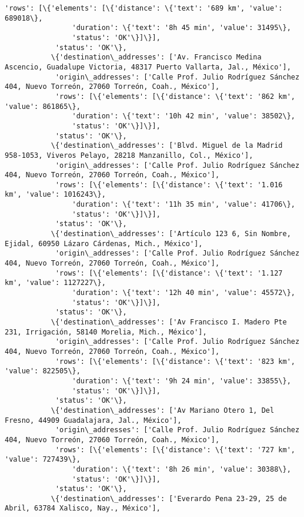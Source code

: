 \documentclass[11pt]{article}
\begin{document}
\begin{Verbatim}[commandchars=\\\{\}]
            'rows': [\{'elements': [\{'distance': \{'text': '689 km', 'value': 689018\},
                'duration': \{'text': '8h 45 min', 'value': 31495\},
                'status': 'OK'\}]\}],
            'status': 'OK'\},
           \{'destination\_addresses': ['Av. Francisco Medina Ascencio, Guadalupe Victoria, 48317 Puerto Vallarta, Jal., México'],
            'origin\_addresses': ['Calle Prof. Julio Rodríguez Sánchez 404, Nuevo Torreón, 27060 Torreón, Coah., México'],
            'rows': [\{'elements': [\{'distance': \{'text': '862 km', 'value': 861865\},
                'duration': \{'text': '10h 42 min', 'value': 38502\},
                'status': 'OK'\}]\}],
            'status': 'OK'\},
           \{'destination\_addresses': ['Blvd. Miguel de la Madrid 958-1053, Viveros Pelayo, 28218 Manzanillo, Col., México'],
            'origin\_addresses': ['Calle Prof. Julio Rodríguez Sánchez 404, Nuevo Torreón, 27060 Torreón, Coah., México'],
            'rows': [\{'elements': [\{'distance': \{'text': '1.016 km', 'value': 1016243\},
                'duration': \{'text': '11h 35 min', 'value': 41706\},
                'status': 'OK'\}]\}],
            'status': 'OK'\},
           \{'destination\_addresses': ['Artículo 123 6, Sin Nombre, Ejidal, 60950 Lázaro Cárdenas, Mich., México'],
            'origin\_addresses': ['Calle Prof. Julio Rodríguez Sánchez 404, Nuevo Torreón, 27060 Torreón, Coah., México'],
            'rows': [\{'elements': [\{'distance': \{'text': '1.127 km', 'value': 1127227\},
                'duration': \{'text': '12h 40 min', 'value': 45572\},
                'status': 'OK'\}]\}],
            'status': 'OK'\},
           \{'destination\_addresses': ['Av Francisco I. Madero Pte 231, Irrigación, 58140 Morelia, Mich., México'],
            'origin\_addresses': ['Calle Prof. Julio Rodríguez Sánchez 404, Nuevo Torreón, 27060 Torreón, Coah., México'],
            'rows': [\{'elements': [\{'distance': \{'text': '823 km', 'value': 822505\},
                'duration': \{'text': '9h 24 min', 'value': 33855\},
                'status': 'OK'\}]\}],
            'status': 'OK'\},
           \{'destination\_addresses': ['Av Mariano Otero 1, Del Fresno, 44909 Guadalajara, Jal., México'],
            'origin\_addresses': ['Calle Prof. Julio Rodríguez Sánchez 404, Nuevo Torreón, 27060 Torreón, Coah., México'],
            'rows': [\{'elements': [\{'distance': \{'text': '727 km', 'value': 727439\},
                'duration': \{'text': '8h 26 min', 'value': 30388\},
                'status': 'OK'\}]\}],
            'status': 'OK'\},
           \{'destination\_addresses': ['Everardo Pena 23-29, 25 de Abril, 63784 Xalisco, Nay., México'],

\end{Verbatim}
\end{document}
